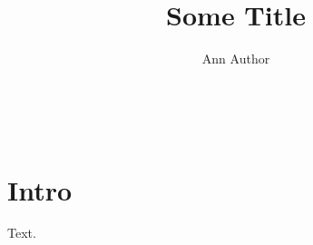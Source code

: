\documentclass{article}
\title{Some Title}\author{Ann Author}
\begin{document}
\begin{center}{\Large\@title}\\[1em]\@author\end{center}
\section{Intro}
Text.
\begin{theindex}\end{theindex}
\end{document}
